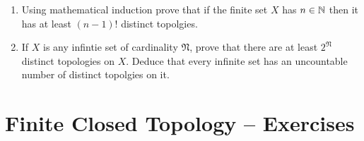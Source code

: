 \documentclass[10pt,a4paper]{report}
\newcommand{\TT}{\mathcal{T}}
\begin{document}
\begin{enumerate}
\begin{enumerate}[label=(\roman*)]
	\item Using mathematical induction prove that if the finite set $X$ has $n \in \mathbb{N}$ then it has at least $(n-1)!$ distinct topolgies.\\
	
	\item If $X$ is any infintie set of cardinality $\mathfrak{N}$, prove that there are at least $2^\mathfrak{N}$ distinct topologies on $X$.  Deduce that every infinite set has an uncountable number of distinct topolgies on it.
\end{enumerate}
\end{enumerate}

\newpage
\section{Finite Closed Topology -- Exercises}
\end{document}
